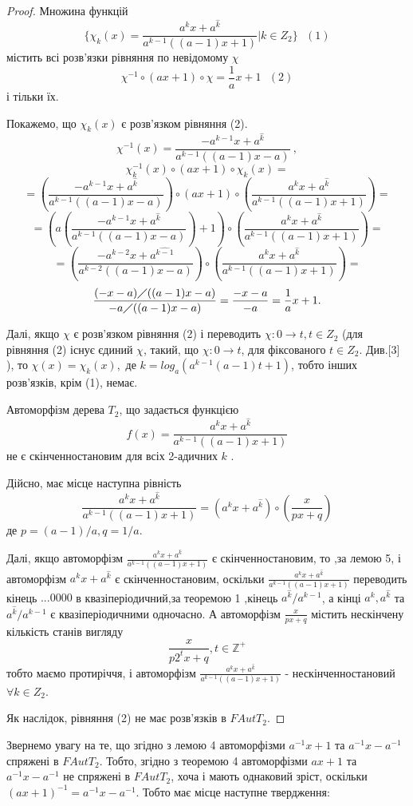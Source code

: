\documentclass[a4paper,12pt]{article} \usepackage{a4wide}
\numberwithin{equation}{subsection}
\begin{document}
\begin{proof}
Множина функцій
$$\{\chi_k(x)=\frac{a^kx+a^{\widehat{k}}}{a^{k-1}((a-1)x+1)}|k\in
Z_2\}\ \ \ (1)$$ містить всі розв'язки рівняння по невідомому
$\chi$
$$\chi^{-1}\circ  (ax+1)\circ  \chi=\frac{1}{a}x+1 \ \ \ (2)$$ і
тільки їх.

Покажемо, що $\chi_k(x)$ є розв'язком рівняння (2).
$$ \chi^{-1}(x)=\frac{-a^{k-1}x+a^{\widehat{k}}}{a^{k-1}((a-1)x-a)}\ ,$$
$$\chi_k^{-1}(x)\circ  (ax+1)\circ  \chi_k(x) =$$
$$=(\frac{-a^{k-1}x+a^{\widehat{k}}}{a^{k-1}((a-1)x-a)})\circ
(ax+1)\circ (\frac{a^kx+a^{\widehat{k}}}{a^{k-1}((a-1)x+1)})=$$ $$
=(a(\frac{-a^{k-1}x+a^{\widehat{k}}}{a^{k-1}((a-1)x-a)})+1) \circ (\frac{a^kx+a^{\widehat{k}}}{a^{k-1}((a-1)x+ 1)})=$$
$$=(\frac{-a^{k-2}x+a^{\widehat{k-1}}}{a^{k-2}((a-1)x-a)})\circ (\frac{a^kx+a^{\widehat{k}}}{a^{k-1}((a-1)x+1)})=
$$ $$ \frac{(-x-a)\diagup ((a-1)x-a)}{-a\diagup ((a-1)x-a)}=\frac{-x-a}{-a}=\frac{1}{a}x+1.$$

Далі, якщо $\chi$ є розв'язком рівняння (2) і переводить
$\chi:0\rightarrow t, t\in Z_2$ (для рівняння (2) існує єдиний
$\chi$, такий, що $\chi:0\rightarrow t$, для фіксованого $t\in
Z_2$. Див.[3] ), то $\chi(x)=\chi_k(x),$ де
$k=log_a(a^{k-1}(a-1)t+1)$, тобто інших розв'язків, крім (1),
 немає.


 Автоморфізм дерева $T_2$, що задається функцією $$f(x)=\frac{a^kx+a^{\widehat{k}}}{a^{k-1}((a-1)x+1)}$$
не є скінченностановим для  всіх 2-адичних $ k $ .


 Дійсно, має місце наступна рівність $$\frac{a^kx+a^{\widehat{k}}}{a^{k-1}((a-1)x+1)}
 =(a^kx+a^{\widehat{k}})\circ (\frac{x}{px+q}) $$ де $p=(a-1)/a , q=1/a$.

   Далі, якщо автоморфізм $\frac{a^kx+a^{\widehat{k}}}{a^{k-1}((a-1)x+1)}$ є скінченностановим,
  то ,за лемою 5, і автоморфізм $a^kx+a^{\widehat{k}}$  є скінченностановим,
   оскільки $\frac{a^kx+a^{\widehat{k}}}{a^{k-1}((a-1)x+1)}$
  переводить кінець $...0000$ в квазіперіодичний,за теоремою 1 ,кінець
  $a^{\widehat{k}}/a^{k-1}$, а кінці $a^k,a^{\widehat{k}}$ та $a^{\widehat{k}}/a^{k-1}$
   є квазіперіодичними одночасно. А автоморфізм $\frac{x}{px+q}$ містить нескінчену кількість станів вигляду
$$\frac{x}{p2^tx+q},t \in \mathbb{Z}^+$$ тобто маємо протиріччя,
 і автоморфізм $\frac{a^kx+a^{\widehat{k}}}{a^{k-1}((a-1)x+1)}$ - нескінченностановий $\forall k \in Z_2$.


 Як наслідок, рівняння (2) не має
  розв'язків в $FAutT_2$.
\end{proof}
Звернемо увагу на те, що згідно з лемою 4 автоморфізми $a^{-1}x+1$
та $a^{-1}x-a^{-1}$ спряжені в $FAutT_2$. Тобто, згідно з теоремою
4 автоморфізми $ax+1$ та $a^{-1}x-a^{-1}$ не спряжені в $FAutT_2$,
хоча і мають однаковий зріст, оскільки
$(ax+1)^{-1}={a^{-1}x-a^{-1}}$. Тобто має місце наступне
твердження:
\end{document}
